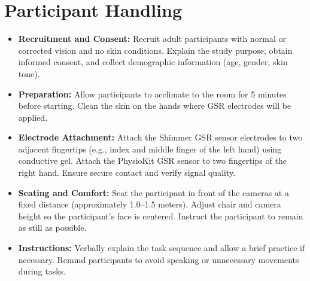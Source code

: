 \section{Participant Handling}
\begin{itemize}
    \item \textbf{Recruitment and Consent:} Recruit adult participants with normal or corrected vision and no skin conditions. Explain the study purpose, obtain informed consent, and collect demographic information (age, gender, skin tone).
    \item \textbf{Preparation:} Allow participants to acclimate to the room for 5 minutes before starting. Clean the skin on the hands where GSR electrodes will be applied.
    \item \textbf{Electrode Attachment:} Attach the Shimmer GSR sensor electrodes to two adjacent fingertips (e.g., index and middle finger of the left hand) using conductive gel. Attach the PhysioKit GSR sensor to two fingertips of the right hand. Ensure secure contact and verify signal quality.
    \item \textbf{Seating and Comfort:} Seat the participant in front of the cameras at a fixed distance (approximately 1.0–1.5 meters). Adjust chair and camera height so the participant’s face is centered. Instruct the participant to remain as still as possible.
    \item \textbf{Instructions:} Verbally explain the task sequence and allow a brief practice if necessary. Remind participants to avoid speaking or unnecessary movements during tasks.
\end{itemize}


